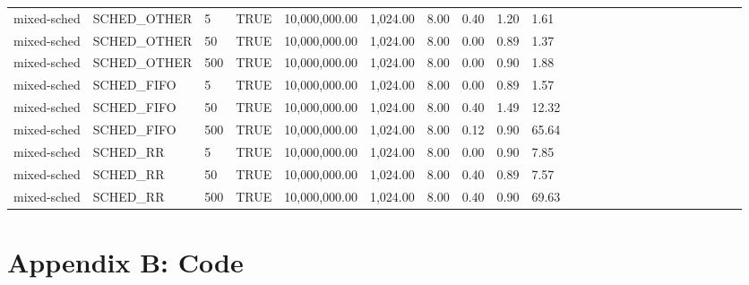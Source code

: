 \documentclass{article}
\begin{document}
\begin{table}[H]
{\begin{tabular}{llllllllllllllllllllllll}
mixed-sched & SCHED\_OTHER & 5                   & TRUE          & 10,000,000.00 & 1,024.00              & 8.00              & 0.40        & 1.20      & 1.61      &  &  &  &  &  &  &  &  &  &  &  &  &  &  \\
mixed-sched & SCHED\_OTHER & 50                  & TRUE          & 10,000,000.00 & 1,024.00              & 8.00              & 0.00        & 0.89      & 1.37      &  &  &  &  &  &  &  &  &  &  &  &  &  &  \\
mixed-sched & SCHED\_OTHER & 500                 & TRUE          & 10,000,000.00 & 1,024.00              & 8.00              & 0.00        & 0.90      & 1.88      &  &  &  &  &  &  &  &  &  &  &  &  &  &  \\
mixed-sched & SCHED\_FIFO  & 5                   & TRUE          & 10,000,000.00 & 1,024.00              & 8.00              & 0.00        & 0.89      & 1.57      &  &  &  &  &  &  &  &  &  &  &  &  &  &  \\
mixed-sched & SCHED\_FIFO  & 50                  & TRUE          & 10,000,000.00 & 1,024.00              & 8.00              & 0.40        & 1.49      & 12.32     &  &  &  &  &  &  &  &  &  &  &  &  &  &  \\
mixed-sched & SCHED\_FIFO  & 500                 & TRUE          & 10,000,000.00 & 1,024.00              & 8.00              & 0.12        & 0.90      & 65.64     &  &  &  &  &  &  &  &  &  &  &  &  &  &  \\
mixed-sched & SCHED\_RR    & 5                   & TRUE          & 10,000,000.00 & 1,024.00              & 8.00              & 0.00        & 0.90      & 7.85      &  &  &  &  &  &  &  &  &  &  &  &  &  &  \\
mixed-sched & SCHED\_RR    & 50                  & TRUE          & 10,000,000.00 & 1,024.00              & 8.00              & 0.40        & 0.89      & 7.57      &  &  &  &  &  &  &  &  &  &  &  &  &  &  \\
mixed-sched & SCHED\_RR    & 500                 & TRUE          & 10,000,000.00 & 1,024.00              & 8.00              & 0.40        & 0.90      & 69.63     &  &  &  &  &  &  &  &  &  &  &  &  &  &
\end{tabular}
}
\end{table}



\section{Appendix B: Code}
\end{document}
